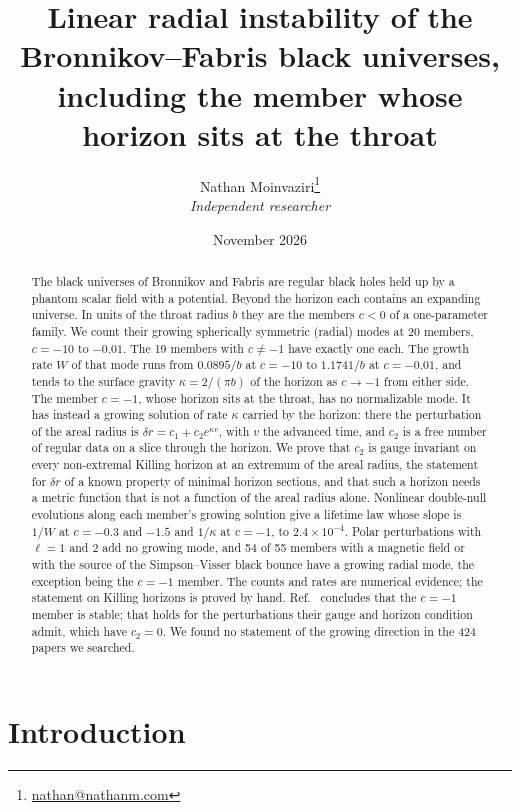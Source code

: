 \documentclass[11pt]{article}
\title{Linear radial instability of the Bronnikov--Fabris black universes,\\including the member whose horizon sits at the throat}
\author{Nathan Moinvaziri\thanks{\href{mailto:nathan@nathanm.com}{nathan@nathanm.com}}\\[2pt]
\normalsize\textit{Independent researcher}}
\date{November 2026}
\theoremstyle{plain}
\begin{document}
\maketitle

\begin{abstract}
The black universes of Bronnikov and Fabris are regular black holes held up by a phantom scalar field with a potential.
Beyond the horizon each contains an expanding universe. In units of the throat radius $b$ they are the members $c<0$ of a
one-parameter family. We count their growing spherically symmetric (radial) modes at 20 members, $c=-10$ to $-0.01$. The 19
members with $c\ne-1$ have exactly one each. The growth rate $W$ of that mode runs from $0.0895/b$ at $c=-10$ to $1.1741/b$ at $c=-0.01$,
and tends to the surface gravity $\kappa=2/(\pi b)$ of the horizon as $c\to-1$ from either side. The member $c=-1$, whose
horizon sits at the throat, has no normalizable mode. It has instead a growing solution of rate $\kappa$ carried by the
horizon: there the perturbation of the areal radius is $\delta r=c_1+c_2e^{\kappa v}$, with $v$ the advanced time, and $c_2$
is a free number of regular data on a slice through the horizon. We prove that $c_2$ is gauge invariant on every
non-extremal Killing horizon at an extremum of the areal radius, the statement for $\delta r$ of a known property of
minimal horizon sections, and that such a horizon needs a metric function that is not a function of the areal radius alone. Nonlinear double-null evolutions along each member's growing solution give a
lifetime law whose slope is $1/W$ at $c=-0.3$ and $-1.5$ and $1/\kappa$ at $c=-1$, to $2.4\times10^{-4}$. Polar
perturbations with $\ell=1$ and $2$ add no growing mode, and 54 of 55 members with a magnetic field or with the source of the
Simpson--Visser black bounce have a growing radial mode, the exception being the $c=-1$ member. The counts and rates are numerical evidence; the statement on Killing horizons is
proved by hand.
Ref.~\cite{BKZ12} concludes that the $c=-1$ member is stable; that holds for the perturbations their gauge and horizon
condition admit, which have $c_2=0$. We found no statement of the growing direction in the 424 papers we searched.
\end{abstract}

\tableofcontents

\section{Introduction}\label{sec:intro}
\end{document}

